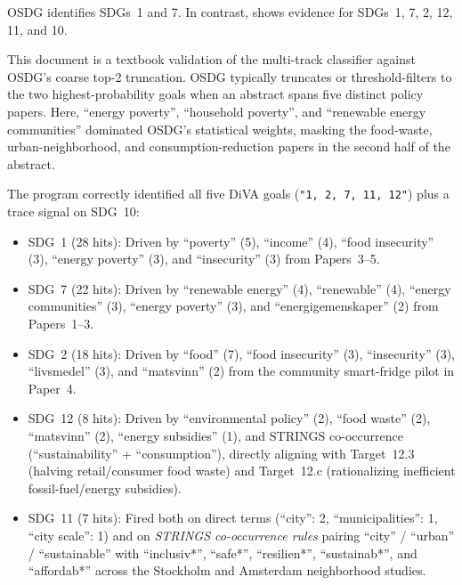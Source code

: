 \begin{casestudySection}
OSDG identifies \glspl{SDG}~1 and 7. In contrast,  shows evidence for \glspl{SDG}~1, 7, 2, 12, 11, and 10.

This document is a textbook validation of the multi-track classifier against OSDG's coarse top-2 truncation. OSDG typically truncates or threshold-filters to the two highest-probability goals when an abstract spans five distinct policy papers. Here, \enquote{energy poverty}, \enquote{household poverty}, and \enquote{renewable energy communities} dominated OSDG's statistical weights, masking the food-waste, urban-neighborhood, and consumption-reduction papers in the second half of the abstract.

The program correctly identified all five \gls{DiVA} goals (\texttt{"1, 2, 7, 11, 12"}) plus a trace signal on \gls{SDG}~10:
\begin{itemize}
    \item \gls{SDG}~1 (\num{28} hits): Driven by \enquote{poverty} (5), \enquote{income} (4), \enquote{food insecurity} (3), \enquote{energy poverty} (3), and \enquote{insecurity} (3) from Papers~3--5.
    
    \item \gls{SDG}~7 (\num{22} hits): Driven by \enquote{renewable energy} (4), \enquote{renewable} (4), \enquote{energy communities} (3), \enquote{energy poverty} (3), and \enquote{\foreignlanguage{swedish}{energigemenskaper}} (2) from Papers~1--3.

    \item \gls{SDG}~2 (\num{18} hits): Driven by \enquote{food} (7), \enquote{food insecurity} (3), \enquote{insecurity} (3), \enquote{\foreignlanguage{swedish}{livsmedel}} (3), and \enquote{\foreignlanguage{swedish}{matsvinn}} (2) from the community smart-fridge pilot in Paper~4.

    \item \gls{SDG}~12 (\num{8} hits): Driven by \enquote{environmental policy} (2), \enquote{food waste} (2), \enquote{\foreignlanguage{swedish}{matsvinn}} (2), \enquote{energy subsidies} (1), and STRINGS co-occurrence (\enquote{sustainability} + \enquote{consumption}), directly aligning with Target~12.3 (halving retail/consumer food waste) and Target~12.c (rationalizing inefficient fossil-fuel/energy subsidies).
    
    \item \gls{SDG}~11 (\num{7} hits): Fired both on direct terms (\enquote{city}: 2, \enquote{municipalities}: 1, \enquote{city scale}: 1) and on \textit{STRINGS co-occurrence rules} pairing \enquote{city} / \enquote{urban} / \enquote{sustainable} with \enquote{inclusiv*}, \enquote{safe*}, \enquote{resilien*}, \enquote{sustainab*}, and \enquote{affordab*} across the Stockholm and Amsterdam neighborhood studies.


\end{itemize}
\end{casestudySection}
